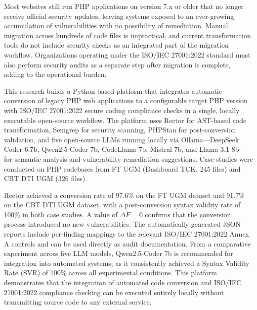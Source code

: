 
Most websites still run PHP applications on version 7.x or older that no longer receive official security updates, leaving systems exposed to an ever-growing accumulation of vulnerabilities with no possibility of remediation. Manual migration across hundreds of code files is impractical, and current transformation tools do not include security checks as an integrated part of the migration workflow. Organizations operating under the ISO/IEC 27001:2022 standard must also perform security audits as a separate step after migration is complete, adding to the operational burden.

\hspace{1cm} This research builds a Python-based platform that integrates automatic conversion of legacy PHP web applications to a configurable target PHP version with ISO/IEC 27001:2022 secure coding compliance checks in a single, locally executable open-source workflow. The platform uses Rector for AST-based code transformation, Semgrep for security scanning, PHPStan for post-conversion validation, and five open-source LLMs running locally via Ollama---DeepSeek Coder 6.7b, Qwen2.5-Coder 7b, CodeLlama 7b, Mistral 7b, and Llama 3.1 8b---for semantic analysis and vulnerability remediation suggestions. Case studies were conducted on PHP codebases from FT UGM (Dashboard TCK, 245 files) and CBT DTI UGM (326 files).

\hspace{1cm} Rector achieved a conversion rate of 97.6\% on the FT UGM dataset and 91.7\% on the CBT DTI UGM dataset, with a post-conversion syntax validity rate of 100\% in both case studies. A value of $\Delta F = 0$ confirms that the conversion process introduced no new vulnerabilities. The automatically generated JSON reports include per-finding mappings to the relevant ISO/IEC 27001:2022 Annex A controls and can be used directly as audit documentation. From a comparative experiment across five LLM models, Qwen2.5-Coder 7b is recommended for integration into automated systems, as it consistently achieved a Syntax Validity Rate (SVR) of 100\% across all experimental conditions. This platform demonstrates that the integration of automated code conversion and ISO/IEC 27001:2022 compliance checking can be executed entirely locally without transmitting source code to any external service.

